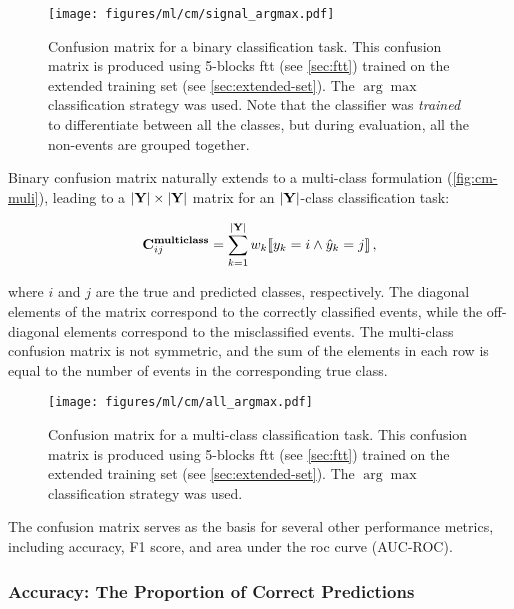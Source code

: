 \begin{figure}[htb]
    \centering
    \texttt{[image: figures/ml/cm/signal\_argmax.pdf]}
    \caption[Confusion matrix for a binary classification task]
    {Confusion matrix for a binary classification task. This confusion matrix is produced using 5-blocks
        \gls{ftt} (see \autoref{sec:ftt}) trained on the extended training set (see \autoref{sec:extended-set}). The
        $\arg\max$ classification strategy was used.  Note that the classifier was \emph{trained} to differentiate
        between all the classes, but during evaluation, all the non-\tth events are grouped together.}
    \label{fig:cm}
\end{figure}

Binary confusion matrix naturally extends to a multi-class formulation (\autoref{fig:cm-muli}), leading to a
$|\textbf{Y}| \times |\textbf{Y}|$ matrix for an $|\textbf{Y}|$-class classification task:

\begin{equation}
    \mathbf{C}^{\textbf{multiclass}}_{ij} = \sum_{k=1}^{|\textbf{Y}|} w_k \llbracket y_k = i \land \hat{y}_k = j \rrbracket\,,
\end{equation}

where $i$ and $j$ are the true and predicted classes, respectively. The diagonal elements of the matrix correspond to
the correctly classified events, while the off-diagonal elements correspond to the misclassified events. The
multi-class confusion matrix is not symmetric, and the sum of the elements in each row is equal to the number of events
in the corresponding true class.

\begin{figure}[htb]
    \centering
    \texttt{[image: figures/ml/cm/all\_argmax.pdf]}
    \caption[Confusion matrix for a multi-class classification task]
    {Confusion matrix for a multi-class classification task. This confusion matrix is produced using 5-blocks
        \gls{ftt} (see \autoref{sec:ftt}) trained on the extended training set (see \autoref{sec:extended-set}). The
        $\arg\max$ classification strategy was used.}
    \label{fig:cm-muli}
\end{figure}

The confusion matrix serves as the basis for several other performance metrics, including accuracy, F1 score, and area
under the \gls{roc} curve (AUC-ROC).

\subsubsection{Accuracy: The Proportion of Correct Predictions}

